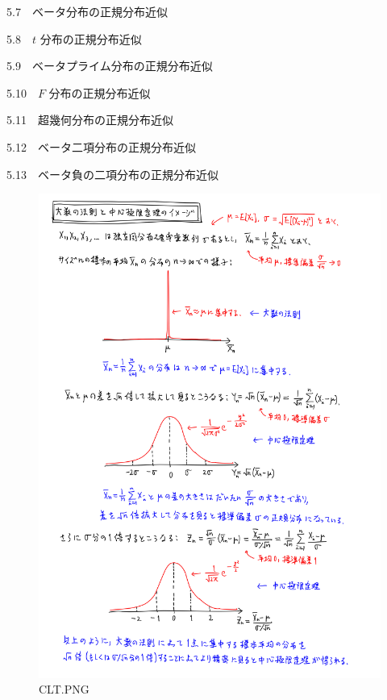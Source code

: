 \documentclass[
  letterpaper,
  DIV=11,
  numbers=noendperiod]{scrartcl}
\begin{document}
{{5.7~~}ベータ分布の正規分布近似}

{{5.8~~}\(t\) 分布の正規分布近似}

{{5.9~~}ベータプライム分布の正規分布近似}

{{5.10~~}\(F\) 分布の正規分布近似}

{{5.11~~}超幾何分布の正規分布近似}

{{5.12~~}ベータ二項分布の正規分布近似}

{{5.13~~}ベータ負の二項分布の正規分布近似}

\begin{figure}

{\centering \includegraphics{05 Central limit theorem_files/figure-pdf/CLT.PNG}

}

\caption{CLT.PNG}

\end{figure}
\end{document}
